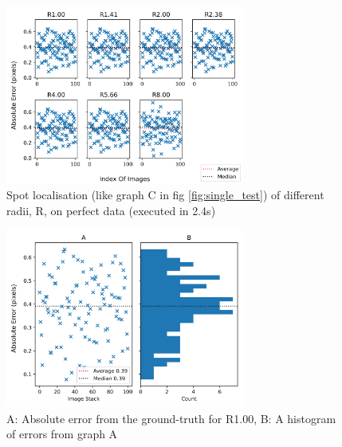\documentclass[aps,pra,a4paper,nofootinbib,onecolumn,tightenlines,longbibliography,12pt,amsfonts,amssymb,amsmath,floatfix]{revtex4-2} %
\begin{document}
  \begin{figure}[H]
    \begin{center}
      \includegraphics[width=0.7\textwidth]{project_pics/no_noise_all_r.png}
    \end{center}
    \caption{Spot localisation (like graph C in fig \ref{fig:single_test}) of different radii, R, on perfect data (executed in 2.4s)}
    \label{fig:no_noise_all_r}
  \end{figure}

  \begin{figure}[H]
    \begin{center}
      \includegraphics[width=0.7\textwidth]{project_pics/single_histo.png}
    \end{center}
    \caption{A: Absolute error from the ground-truth for R1.00, B: A histogram of errors from graph A}
    \label{fig:single_histo}
  \end{figure}
  
\end{document}
